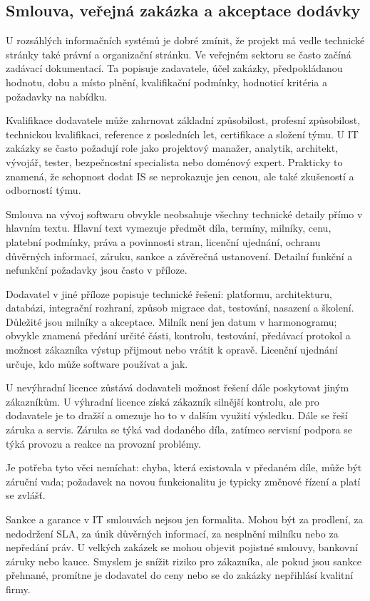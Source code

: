 \documentclass[11pt,a4paper]{article}
\begin{document}
\subsection*{Smlouva, veřejná zakázka a akceptace dodávky}

U rozsáhlých informačních systémů je dobré zmínit, že projekt má vedle technické stránky také právní a organizační stránku. Ve veřejném sektoru se často začíná zadávací dokumentací. Ta popisuje zadavatele, účel zakázky, předpokládanou hodnotu, dobu a místo plnění, kvalifikační podmínky, hodnoticí kritéria a požadavky na nabídku.

Kvalifikace dodavatele může zahrnovat základní způsobilost, profesní způsobilost, technickou kvalifikaci, reference z posledních let, certifikace a složení týmu. U IT zakázky se často požadují role jako projektový manažer, analytik, architekt, vývojář, tester, bezpečnostní specialista nebo doménový expert. Prakticky to znamená, že schopnost dodat IS se neprokazuje jen cenou, ale také zkušeností a odborností týmu.

Smlouva na vývoj softwaru obvykle neobsahuje všechny technické detaily přímo v hlavním textu. Hlavní text vymezuje předmět díla, termíny, milníky, cenu, platební podmínky, práva a povinnosti stran, licenční ujednání, ochranu důvěrných informací, záruku, sankce a závěrečná ustanovení. Detailní funkční a nefunkční požadavky jsou často v příloze.

Dodavatel v jiné příloze popisuje technické řešení: platformu, architekturu, databázi, integrační rozhraní, způsob migrace dat, testování, nasazení a školení. Důležité jsou milníky a akceptace. Milník není jen datum v harmonogramu; obvykle znamená předání určité části, kontrolu, testování, předávací protokol a možnost zákazníka výstup přijmout nebo vrátit k opravě. Licenční ujednání určuje, kdo může software používat a jak.

U nevýhradní licence zůstává dodavateli možnost řešení dále poskytovat jiným zákazníkům. U výhradní licence získá zákazník silnější kontrolu, ale pro dodavatele je to dražší a omezuje ho to v dalším využití výsledku. Dále se řeší záruka a servis. Záruka se týká vad dodaného díla, zatímco servisní podpora se týká provozu a reakce na provozní problémy.

Je potřeba tyto věci nemíchat: chyba, která existovala v předaném díle, může být záruční vada; požadavek na novou funkcionalitu je typicky změnové řízení a platí se zvlášť.

Sankce a garance v IT smlouvách nejsou jen formalita. Mohou být za prodlení, za nedodržení SLA, za únik důvěrných informací, za nesplnění milníku nebo za nepředání práv. U velkých zakázek se mohou objevit pojistné smlouvy, bankovní záruky nebo kauce. Smyslem je snížit riziko pro zákazníka, ale pokud jsou sankce přehnané, promítne je dodavatel do ceny nebo se do zakázky nepřihlásí kvalitní firmy.
\end{document}
